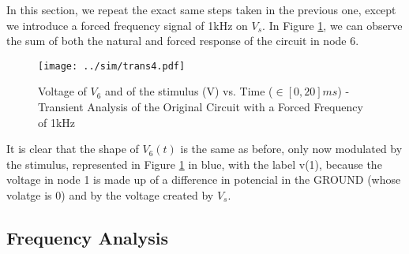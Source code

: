 In this section, we repeat the exact same steps taken in the previous one, except we introduce a forced frequency signal of 1kHz on $V_s$. In Figure \ref{fig:sim-graph4}, we can observe the sum of both the natural and forced response of the circuit in node 6.


\begin{figure}[h] \centering
\texttt{[image: ../sim/trans4.pdf]}
\caption{Voltage of $V_6$ and of the stimulus (V) vs. Time ($\in [0, 20]ms$) - Transient Analysis of the Original Circuit with a Forced Frequency of 1kHz}
\label{fig:sim-graph4}
\end{figure}

It is clear that the shape of $V_6(t)$ is the same as before, only now modulated by the stimulus, represented in Figure \ref{fig:sim-graph4} in blue, with the label v(1), because the voltage in node 1 is made up of a difference in potencial in the GROUND (whose volatge is 0) and by the voltage created by $V_s$.

\subsection{Frequency Analysis}
\label{subsec:sim_freq}









